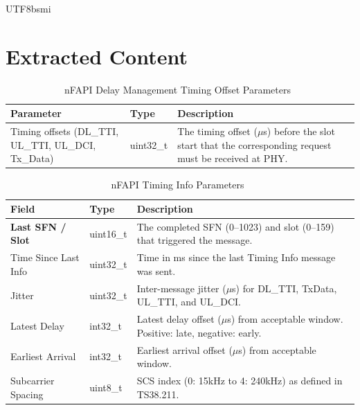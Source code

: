 \documentclass[conference,onecolumn]{IEEEtran}
\begin{document}
\begin{CJK}{UTF8}{bsmi}
\section*{Extracted Content}

\begin{table}[htbp]
\caption{nFAPI Delay Management Timing Offset Parameters~\cite{nfapi_spec}}
\label{tab:delay_mgmt_offsets}
\begin{center}
\begin{tabularx}{\columnwidth}{X|l|X}
\toprule
\textbf{Parameter} & \textbf{Type} & \textbf{Description} \\ \midrule
Timing offsets (DL\_TTI, UL\_TTI, UL\_DCI, Tx\_Data) & uint32\_t & The timing offset ($\mu$s) before the slot start that the corresponding request must be received at PHY. \\ \bottomrule
\end{tabularx}
\end{center}
\end{table}

\hrulefill\par\vspace{1cm}

\begin{table}[htbp]
\caption{nFAPI Timing Info Parameters~\cite{nfapi_spec}}
\label{tab:timing_info}
\begin{center}
\begin{tabularx}{\columnwidth}{l|l|X}
\toprule
\textbf{Field} & \textbf{Type} & \textbf{Description} \\ \midrule
\textbf{Last SFN / Slot} & uint16\_t & The completed SFN (0--1023) and slot (0--159) that triggered the message. \\ 
Time Since Last Info & uint32\_t & Time in ms since the last Timing Info message was sent. \\ 
Jitter & uint32\_t & Inter-message jitter ($\mu$s) for DL\_TTI, TxData, UL\_TTI, and UL\_DCI. \\ 
Latest Delay & int32\_t & Latest delay offset ($\mu$s) from acceptable window. Positive: late, negative: early. \\ 
Earliest Arrival & int32\_t & Earliest arrival offset ($\mu$s) from acceptable window. \\ 
Subcarrier Spacing & uint8\_t & SCS index (0: 15kHz to 4: 240kHz) as defined in TS38.211. \\ \bottomrule
\end{tabularx}
\end{center}
\end{table}


\end{CJK}
\end{document}
